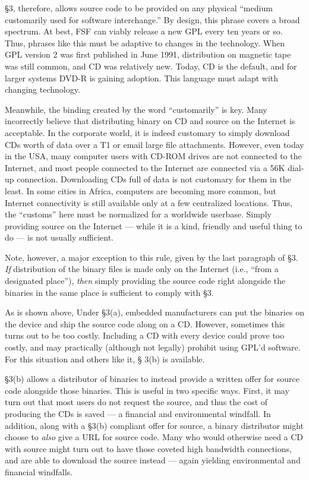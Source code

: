 \S 3, therefore, allows source code to be provided on any physical
``medium customarily used for software interchange.''  By design, this
phrase covers a broad spectrum. At best, FSF can viably release a new GPL
every ten years or so. Thus, phrases like this must be adaptive to
changes in the technology. When GPL version 2 was first published in June
1991, distribution on magnetic tape was still common, and CD was
relatively new. Today, CD is the default, and for larger systems DVD-R is
gaining adoption. This language must adapt with changing technology.

Meanwhile, the binding created by the word ``customarily'' is key. Many
incorrectly believe that distributing binary on CD and source on the
Internet is acceptable. In the corporate world, it is indeed customary to
simply download CDs worth of data over a T1 or email large file
attachments. However, even today in the USA, many computer users with
CD-ROM drives are not connected to the Internet, and most people connected
to the Internet are connected via a 56K dial-up connection. Downloading
CDs full of data is not customary for them in the least. In some cities
in Africa, computers are becoming more common, but Internet connectivity
is still available only at a few centralized locations. Thus, the
``customs'' here must be normalized for a worldwide userbase. Simply
providing source on the Internet --- while it is a kind, friendly and
useful thing to do --- is not usually sufficient.

Note, however, a major exception to this rule, given by the last paragraph
of \S 3. \emph{If} distribution of the binary files is made only on the
Internet (i.e., ``from a designated place''), \emph{then} simply providing
the source code right alongside the binaries in the same place is
sufficient to comply with \S 3.

\medskip

As is shown above, Under \S 3(a), embedded manufacturers can put the
binaries on the device and ship the source code along on a CD\@. However,
sometimes this turns out to be too costly. Including a CD with every
device could prove too costly, and may practically (although not legally)
prohibit using GPL'd software. For this situation and others like it, \S
3(b) is available.

\S 3(b) allows a distributor of binaries to instead provide a written
offer for source code alongside those binaries. This is useful in two
specific ways. First, it may turn out that most users do not request the
source, and thus the cost of producing the CDs is saved --- a financial
and environmental windfall. In addition, along with a \S 3(b) compliant
offer for source, a binary distributor might choose to \emph{also} give a
URL for source code. Many who would otherwise need a CD with source might
turn out to have those coveted high bandwidth connections, and are able to
download the source instead --- again yielding environmental and financial
windfalls.

